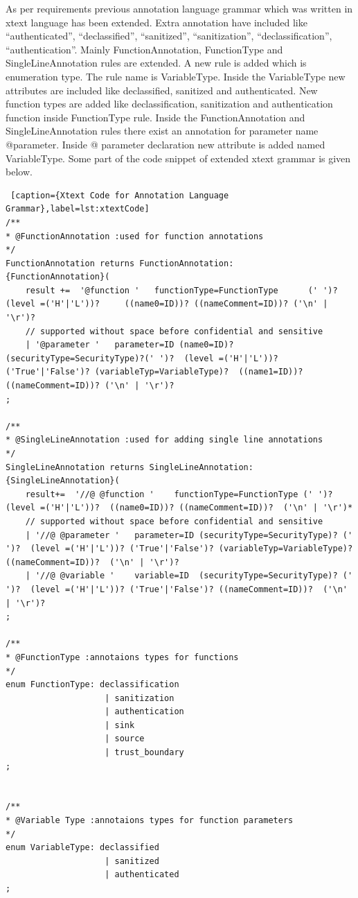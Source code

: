 As per requirements previous annotation language grammar which was written in xtext language has been extended. Extra annotation have included like \enquote{authenticated}, \enquote{declassified}, \enquote{sanitized}, \enquote{sanitization}, \enquote{declassification}, \enquote{authentication}. Mainly FunctionAnnotation, FunctionType  and SingleLineAnnotation rules  are extended. A new rule is added which is enumeration type. The rule name is VariableType. Inside the VariableType new attributes are included like declassified, sanitized and authenticated. New function types are added like declassification, sanitization and authentication function inside FunctionType rule. Inside the FunctionAnnotation and SingleLineAnnotation rules there exist an annotation for parameter name @parameter. Inside @ parameter declaration new attribute is added named VariableType. Some part of the code snippet of extended xtext grammar is given below. 

\begin{lstlisting} [caption={Xtext Code for Annotation Language Grammar},label=lst:xtextCode]
/**
* @FunctionAnnotation :used for function annotations
*/ 
FunctionAnnotation returns FunctionAnnotation:
{FunctionAnnotation}( 
	result +=  '@function '   functionType=FunctionType      (' ')?                              (level =('H'|'L'))?     ((name0=ID))? ((nameComment=ID))? ('\n' | '\r')?
	// supported without space before confidential and sensitive
	| '@parameter '   parameter=ID (name0=ID)? (securityType=SecurityType)?(' ')?  (level =('H'|'L'))? ('True'|'False')? (variableTyp=VariableType)?  ((name1=ID))? ((nameComment=ID))? ('\n' | '\r')?	
;

/**
* @SingleLineAnnotation :used for adding single line annotations
*/ 
SingleLineAnnotation returns SingleLineAnnotation:
{SingleLineAnnotation}(
	result+=  '//@ @function '    functionType=FunctionType (' ')?                  (level =('H'|'L'))?  ((name0=ID))? ((nameComment=ID))?  ('\n' | '\r')*
	// supported without space before confidential and sensitive
	| '//@ @parameter '   parameter=ID (securityType=SecurityType)? (' ')?  (level =('H'|'L'))? ('True'|'False')? (variableTyp=VariableType)?  ((nameComment=ID))?  ('\n' | '\r')?
	| '//@ @variable '    variable=ID  (securityType=SecurityType)? (' ')?  (level =('H'|'L'))? ('True'|'False')? ((nameComment=ID))?  ('\n' | '\r')?
;

/**
* @FunctionType :annotaions types for functions
*/ 
enum FunctionType: declassification 
					| sanitization
					| authentication
					| sink
					| source
					| trust_boundary
;


/**
* @Variable Type :annotaions types for function parameters
*/ 
enum VariableType: declassified 
					| sanitized
					| authenticated
;	
\end{lstlisting}

